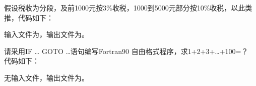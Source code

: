 \documentclass{ctexart}
\begin{document}
\begin{answer}
            假设税收为分段，及前1000元按3\%收税，1000到5000元部分按10\%收税，以此类推，代码如下：

            输入文件为，输出文件为。

            请采用IF … GOTO …语句编写Fortran90 自由格式程序，求1+2+3+…+100=？\\

            代码如下：

            无输入文件，输出文件为。

    \end{answer}
\end{document}
